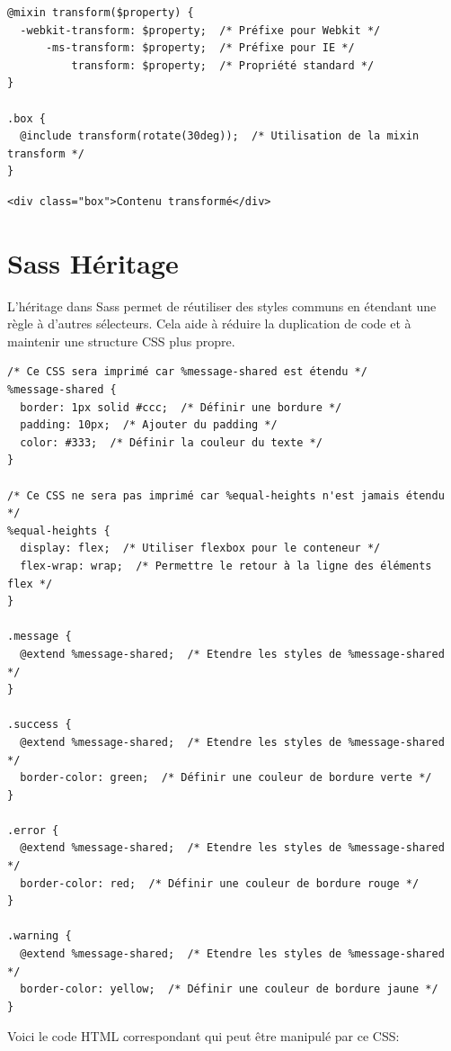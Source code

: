 \documentclass{report}
\begin{document}
\begin{multicols*}{2}
\begin{lstlisting}[style=CSSDraculaLight]
@mixin transform($property) {
  -webkit-transform: $property;  /* Préfixe pour Webkit */
      -ms-transform: $property;  /* Préfixe pour IE */
          transform: $property;  /* Propriété standard */
}

.box { 
  @include transform(rotate(30deg));  /* Utilisation de la mixin transform */
}
\end{lstlisting}

\begin{lstlisting}[style=HTMLDraculaDark]
<div class="box">Contenu transformé</div>
\end{lstlisting}


\section*{Sass Héritage}

L'héritage dans Sass permet de réutiliser des styles communs en étendant une règle à d'autres sélecteurs. Cela aide à réduire la duplication de code et à maintenir une structure CSS plus propre.

\begin{lstlisting}[style=CSSDraculaLight]
/* Ce CSS sera imprimé car %message-shared est étendu */
%message-shared {
  border: 1px solid #ccc;  /* Définir une bordure */
  padding: 10px;  /* Ajouter du padding */
  color: #333;  /* Définir la couleur du texte */
}

/* Ce CSS ne sera pas imprimé car %equal-heights n'est jamais étendu */
%equal-heights {
  display: flex;  /* Utiliser flexbox pour le conteneur */
  flex-wrap: wrap;  /* Permettre le retour à la ligne des éléments flex */
}

.message {
  @extend %message-shared;  /* Etendre les styles de %message-shared */
}

.success {
  @extend %message-shared;  /* Etendre les styles de %message-shared */
  border-color: green;  /* Définir une couleur de bordure verte */
}

.error {
  @extend %message-shared;  /* Etendre les styles de %message-shared */
  border-color: red;  /* Définir une couleur de bordure rouge */
}

.warning {
  @extend %message-shared;  /* Etendre les styles de %message-shared */
  border-color: yellow;  /* Définir une couleur de bordure jaune */
}
\end{lstlisting}

Voici le code HTML correspondant qui peut être manipulé par ce CSS:


\end{multicols*}
\end{document}
